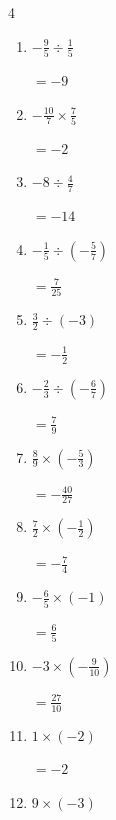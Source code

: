 \begin{multicols}{4}
\begin{enumerate}
        $\displaystyle =-\frac{15}{16}$

  \item $\displaystyle -\frac{9}{5}\div{}\frac{1}{5}$

        $\displaystyle =-9$

  \item $\displaystyle -\frac{10}{7}\times{}\frac{7}{5}$

        $\displaystyle =-2$

  \item $\displaystyle -8\div{}\frac{4}{7}$

        $\displaystyle =-14$

  \item $\displaystyle -\frac{1}{5}\div{}\left(-\frac{5}{7}\right)$

        $\displaystyle =\frac{7}{25}$

  \item $\displaystyle \frac{3}{2}\div{}\left(-3\right)$

        $\displaystyle =-\frac{1}{2}$

  \item $\displaystyle -\frac{2}{3}\div{}\left(-\frac{6}{7}\right)$

        $\displaystyle =\frac{7}{9}$

  \item $\displaystyle \frac{8}{9}\times{}\left(-\frac{5}{3}\right)$

        $\displaystyle =-\frac{40}{27}$

  \item $\displaystyle \frac{7}{2}\times{}\left(-\frac{1}{2}\right)$

        $\displaystyle =-\frac{7}{4}$

\columnbreak %

  \item $\displaystyle -\frac{6}{5}\times{}\left(-1\right)$

        $\displaystyle =\frac{6}{5}$

  \item $\displaystyle -3\times{}\left(-\frac{9}{10}\right)$

        $\displaystyle =\frac{27}{10}$

  \item $\displaystyle 1\times{}\left(-2\right)$

        $\displaystyle =-2$

  \item $\displaystyle 9\times{}\left(-3\right)$


\end{enumerate}
\end{multicols}
